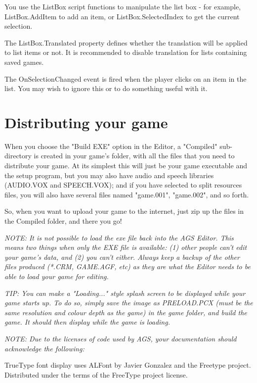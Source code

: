 You use the ListBox script functions to manipulate the list box - for
example, ListBox.AddItem to add an item, or ListBox.SelectedIndex to get the current
selection.

The ListBox.Translated property defines whether the translation will be applied
to list items or not. It is recommended to disable translation for lists containing saved games.

The OnSelectionChanged event is fired when the player clicks on an item in the list.
You may wish to ignore this or to do something useful with it.

\section{Distributing your game}\label{DistGame}%

When you choose the "Build EXE" option in the Editor, a "Compiled" sub-directory
is created in your game's folder, with all the files that you need to distribute
your game. At its simplest this will just be your game executable and the setup
program, but you may also have audio and speech libraries (AUDIO.VOX and
SPEECH.VOX); and if you have selected to split resources files, you will also
have several files named "game.001", "game.002", and so forth.

So, when you want to upload your game to the internet, just zip up the files in
the Compiled folder, and there you go!

\it{NOTE: It is not possible to load the exe file back into the AGS Editor. This
means two things when only the EXE file is available: (1) other people can't
edit your game's data, and (2) you can't either. Always keep a backup of the
other files produced (*.CRM, GAME.AGF, etc) as they are what the Editor
needs to be able to load your game for editing.}

\it{TIP:} You can make a "Loading..." style splash screen to be displayed while your game starts
up. To do so, simply save the image as  PRELOAD.PCX (must be the same resolution and colour depth
as the game) in the game folder, and build the game. It should then display while the game is loading.

\it{NOTE: Due to the licenses of code used by AGS, your documentation should acknowledge the
following:}

TrueType font display uses ALFont by Javier Gonzalez and the Freetype project. Distributed
under the terms of the FreeType project license.

